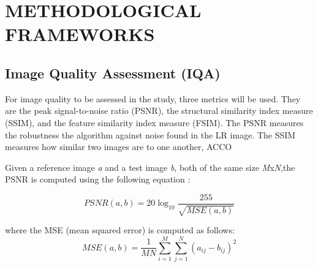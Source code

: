 
\chapter{METHODOLOGICAL FRAMEWORKS} %

\label{Chapter3} %








\section{Image Quality Assessment (IQA)}

For image quality to be assessed in the study, three metrics will be used.
They are the peak signal-to-noise ratio (PSNR), the structural similarity index measure (SSIM), and the feature similarity index measure (FSIM). The PSNR measures the robustness the algorithm against noise found in the LR image.
The SSIM measures how similar two images are to one another, ACCO

Given a reference image \textit{a} and a test image \textit{b}, both of the same size \textit{M}x\textit{N},the PSNR is computed using the following equation \citep{Hore2010}:

\begin{equation}
PSNR(a,b) = 20 \log_{10}\frac{255}{\sqrt{MSE(a,b)}}
\end{equation}

where the MSE (mean squared error) is computed as follows:
\begin{equation}
MSE(a,b) = \frac{1}{MN} \sum\limits_{i=1}^{M} \sum\limits_{j=1}^{N} (a_{ij}-b_{ij})^2
\end{equation}


